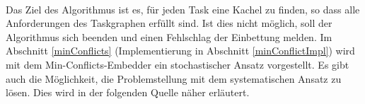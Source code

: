 \ \\
Das Ziel des Algorithmus ist es, für jeden Task eine Kachel zu finden, so dass alle Anforderungen des Taskgraphen erfüllt sind. Ist dies nicht möglich, soll der Algorithmus sich beenden und einen Fehlschlag der Einbettung melden. Im Abschnitt \ref{minConflicts} (Implementierung in Abschnitt \ref{minConflictImpl}) wird mit dem Min-Conflicts-Embedder ein stochastischer Ansatz vorgestellt. Es gibt auch die Möglichkeit, die Problemstellung mit dem systematischen Ansatz zu lösen. Dies wird in der folgenden Quelle näher erläutert.

